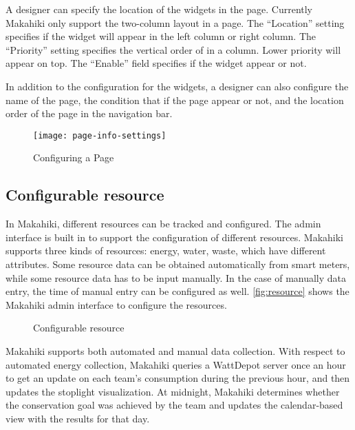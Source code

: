 A designer can specify the location of the widgets in the page. Currently Makahiki only support the two-column layout in a page. The ``Location'' setting specifies if the widget will appear in the left column or right column. The ``Priority'' setting specifies the vertical order of in a column. Lower priority will appear on top. The ``Enable'' field specifies if the widget appear or not. 

In addition to the configuration for the widgets, a designer can also configure the name of the page, the condition that if the page appear or not, and the location order of the page in the navigation bar.

\begin{figure}[!ht]
  \center
  \texttt{[image: page-info-settings]}
  \caption{Configuring a Page}
  \label{fig:page-info-settings}
\end{figure}

\clearpage

\subsection{Configurable resource}
In Makahiki, different resources can be tracked and configured. The admin interface is built in to support the configuration of different resources. Makahiki supports three kinds of resources: energy, water, waste, which have different attributes. Some resource data can be obtained automatically from smart meters, while some resource data has to be input manually. In the case of manually data entry, the time of manual entry can be configured as well. \autoref{fig:resource} shows the Makahiki admin interface to configure the resources.

\begin{figure}[!ht]
	\centering
		\caption{Configurable resource}
		\label{fig:resource}
\end{figure}

Makahiki supports both automated and manual data collection. With respect to automated energy collection, Makahiki queries a WattDepot server once an hour to get an update on each team's consumption during the previous hour, and then updates the stoplight visualization. At midnight, Makahiki determines whether the conservation goal was achieved by the team and updates the calendar-based view with the results for that day.

